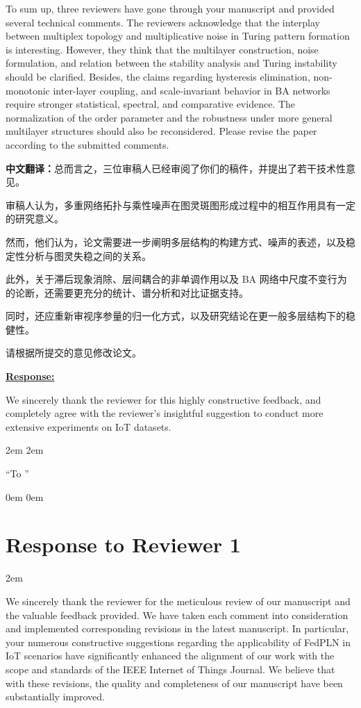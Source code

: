 \documentclass[a4paper,12pt]{article}
\newcommand{\zhtranslationfirst}[1]{%
    \par\medskip\noindent
    {\small\color{blue!60!black}\textbf{中文翻译：}#1}\par
}
\newcommand{\zhtranslation}[1]{%
    \par\smallskip\noindent
    {\small\color{blue!60!black}#1}\par
}
\begin{document}
\begin{tcolorbox}[title = {Comment},fonttitle = \bfseries]
    To sum up, three reviewers have gone through your manuscript and provided several technical comments. The reviewers acknowledge that the interplay between multiplex topology and multiplicative noise in Turing pattern formation is interesting. However, they think that the multilayer construction, noise formulation, and relation between the stability analysis and Turing instability should be clarified. Besides, the claims regarding hysteresis elimination, non-monotonic inter-layer coupling, and scale-invariant behavior in BA networks require stronger statistical, spectral, and comparative evidence. The normalization of the order parameter and the robustness under more general multilayer structures should also be reconsidered. Please revise the paper according to the submitted comments.
    \zhtranslationfirst{总而言之，三位审稿人已经审阅了你们的稿件，并提出了若干技术性意见。}
    \zhtranslation{审稿人认为，多重网络拓扑与乘性噪声在图灵斑图形成过程中的相互作用具有一定的研究意义。}
    \zhtranslation{然而，他们认为，论文需要进一步阐明多层结构的构建方式、噪声的表述，以及稳定性分析与图灵失稳之间的关系。}
    \zhtranslation{此外，关于滞后现象消除、层间耦合的非单调作用以及 BA 网络中尺度不变行为的论断，还需要更充分的统计、谱分析和对比证据支持。}
    \zhtranslation{同时，还应重新审视序参量的归一化方式，以及研究结论在更一般多层结构下的稳健性。}
    \zhtranslation{请根据所提交的意见修改论文。}
\end{tcolorbox}

\noindent \underline {\textbf{Response:}}
\bigskip

We sincerely thank the reviewer for this highly constructive feedback, and completely agree with the reviewer's insightful suggestion to conduct more extensive experiments on IoT datasets.

\leftskip 2em
\rightskip 2em
\medskip

``To ''

\leftskip 0em
\rightskip 0em
\medskip

\newpage
\section*{Response to Reviewer 1}
\parindent 2em

We sincerely thank the reviewer for the meticulous review of our manuscript and the valuable feedback provided.
We have taken each comment into consideration and implemented corresponding revisions in the latest manuscript.
In particular, your numerous constructive suggestions regarding the applicability of FedPLN in IoT scenarios have significantly enhanced the alignment of our work with the scope and standards of the IEEE Internet of Things Journal.
We believe that with these revisions, the quality and completeness of our manuscript have been substantially improved.
\end{document}
